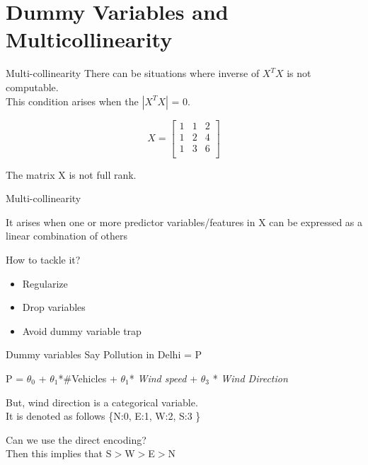 \documentclass{beamer}
\begin{document}
\section{Dummy Variables and Multicollinearity}
\begin{frame}{Multi-collinearity}
    There can be situations where inverse of $X^{T}X$ is not computable. \\
    \pause This condition arises when the $|X^{T}X|$ = 0.
    
    \begin{equation}
    X = \begin{bmatrix}
    1 & 1& 2\\
    1 & 2& 4\\
    1 & 3& 6\\
    \end{bmatrix}
    \end{equation}
    
    \pause The matrix X is not full rank. 
    \end{frame}
    
    
    
    
    
    \begin{frame}{Multi-collinearity}
    
    It arises when one or more predictor variables/features in X can be expressed as a linear combination of others\\
    \vspace{5mm}
    
    
    
    How to tackle it?
    \begin{itemize}
        \item<+-> Regularize
        \item<+-> Drop variables
        \item<+-> Avoid dummy variable trap
    \end{itemize}
    \end{frame}
    \begin{frame}{Dummy variables}
    Say Pollution in Delhi = P
    \pause \begin{center}
        P = $\theta_{0}$ + $\theta_{1}$*\#Vehicles + $\theta_{1}$*
        \textit{Wind speed} + $\theta_{3}$ * \textit{Wind Direction}
    \end{center}
    
    \pause But, wind direction is a categorical variable. \\
    \pause It is denoted as follows \{N:0, E:1, W:2, S:3 \}\\
    \vspace{3em}
    
    \pause Can we use the direct encoding? \\
    \pause Then this implies that S$>$W$>$E$>$N
    \end{frame}
    
\end{document}
